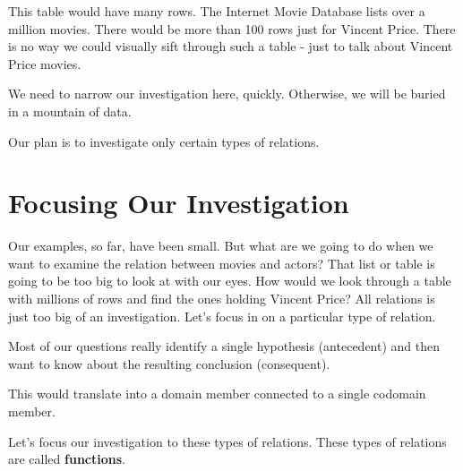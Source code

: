 \documentclass{ximera}
\begin{document}
This table would have many rows. The Internet Movie Database lists over a million movies.  There would be more than 100 rows just for Vincent Price. There is no way we could visually sift through such a table - just to talk about Vincent Price movies.

We need to narrow our investigation here, quickly. Otherwise, we will be buried in a mountain of data.

Our plan is to investigate only certain types of relations.








\section{Focusing Our Investigation}


Our examples, so far, have been small.  But what are we going to do when we want to examine the relation between movies and actors?  That list or table is going to be too big to look at with our eyes.  How would we look through a table with millions of rows and find the ones holding Vincent Price?  All relations is just too big of an investigation. Let's focus in on a particular type of relation.

Most of our questions really identify a single hypothesis (antecedent) and then want to know about the resulting conclusion (consequent).

This would translate into a domain member connected to a single codomain member.

Let's focus our investigation to these types of relations.  These types of relations are called \textbf{functions}.
\end{document}
